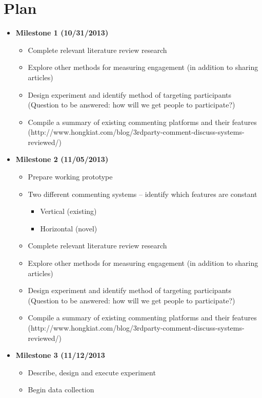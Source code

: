 
\section{Plan}

\begin{itemize}
\item \textbf{Milestone 1 (10/31/2013)}
\begin{itemize}
\item Complete relevant literature review research
\item Explore other methods for measuring engagement (in addition to sharing articles)
\item Design experiment and identify method of targeting participants (Question to be answered: how will we get people to participate?)
\item Compile a summary of existing commenting platforms and their features (http://www.hongkiat.com/blog/3rdparty-comment-discuss-systems-reviewed/)
\end{itemize}

\item \textbf{Milestone 2 (11/05/2013)}
\begin{itemize}
\item Prepare working prototype 
\item Two different commenting systems -- identify which features are constant
\begin{itemize}
\item Vertical (existing)
\item Horizontal (novel)
\end{itemize}
\item Complete relevant literature review research
\item Explore other methods for measuring engagement (in addition to sharing articles)
\item Design experiment and identify method of targeting participants (Question to be answered: how will we get people to participate?)
\item Compile a summary of existing commenting platforms and their features (http://www.hongkiat.com/blog/3rdparty-comment-discuss-systems-reviewed/)
\end{itemize}

\item \textbf{Milestone 3 (11/12/2013}
\begin{itemize}
\item Describe, design and execute experiment 
\item Begin data collection
\end{itemize}


\end{itemize}
